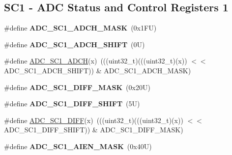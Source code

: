\subsection*{S\+C1 -\/ A\+DC Status and Control Registers 1}
\begin{DoxyCompactItemize}
\item 
\mbox{\label{group___a_d_c___register___masks_ga7450ced3c2b2df20023c2152f1470640}} 
\#define {\bfseries A\+D\+C\+\_\+\+S\+C1\+\_\+\+A\+D\+C\+H\+\_\+\+M\+A\+SK}~(0x1\+F\+U)
\item 
\mbox{\label{group___a_d_c___register___masks_gab2ba46d5132224f2920c1881e2c1b6fe}} 
\#define {\bfseries A\+D\+C\+\_\+\+S\+C1\+\_\+\+A\+D\+C\+H\+\_\+\+S\+H\+I\+FT}~(0\+U)
\item 
\#define \mbox{\hyperlink{group___a_d_c___register___masks_gab2ec3f01d5b560d3f839439b038f3981}{A\+D\+C\+\_\+\+S\+C1\+\_\+\+A\+D\+CH}}(x)~(((uint32\+\_\+t)(((uint32\+\_\+t)(x)) $<$$<$ A\+D\+C\+\_\+\+S\+C1\+\_\+\+A\+D\+C\+H\+\_\+\+S\+H\+I\+FT)) \& A\+D\+C\+\_\+\+S\+C1\+\_\+\+A\+D\+C\+H\+\_\+\+M\+A\+SK)
\item 
\mbox{\label{group___a_d_c___register___masks_gadc514fb491cf08eb3fb0f27298388645}} 
\#define {\bfseries A\+D\+C\+\_\+\+S\+C1\+\_\+\+D\+I\+F\+F\+\_\+\+M\+A\+SK}~(0x20\+U)
\item 
\mbox{\label{group___a_d_c___register___masks_ga1385c936a9440856068dcb917ed9c658}} 
\#define {\bfseries A\+D\+C\+\_\+\+S\+C1\+\_\+\+D\+I\+F\+F\+\_\+\+S\+H\+I\+FT}~(5\+U)
\item 
\#define \mbox{\hyperlink{group___a_d_c___register___masks_ga565092499830413abb547372e66efab1}{A\+D\+C\+\_\+\+S\+C1\+\_\+\+D\+I\+FF}}(x)~(((uint32\+\_\+t)(((uint32\+\_\+t)(x)) $<$$<$ A\+D\+C\+\_\+\+S\+C1\+\_\+\+D\+I\+F\+F\+\_\+\+S\+H\+I\+FT)) \& A\+D\+C\+\_\+\+S\+C1\+\_\+\+D\+I\+F\+F\+\_\+\+M\+A\+SK)
\item 
\mbox{\label{group___a_d_c___register___masks_gaa698d898e077003de10a42184de8f124}} 
\#define {\bfseries A\+D\+C\+\_\+\+S\+C1\+\_\+\+A\+I\+E\+N\+\_\+\+M\+A\+SK}~(0x40\+U)
\item 
\mbox{\label{group___a_d_c___register___masks_gaf2cde8fb207dd348e6313d6d0a5b3761}} 

\end{DoxyCompactItemize}
